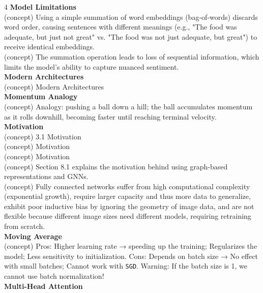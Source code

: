 \documentclass[8pt]{extarticle}
\begin{document}
\begin{multicols}{4}
\vspace{2pt}\textbf{Model Limitations}\\
(concept) Using a simple summation of word embeddings (bag‑of‑words) discards word order, causing sentences with different meanings (e.g., "The food was adequate, but just not great" vs. "The food was not just adequate, but great") to receive identical embeddings.\\
(concept) The summation operation leads to loss of sequential information, which limits the model's ability to capture nuanced sentiment.\\
\vspace{2pt}\textbf{Modern Architectures}\\
(concept) Modern Architectures\\
\vspace{2pt}\textbf{Momentum Analogy}\\
(concept) Analogy: pushing a ball down a hill; the ball accumulates momentum as it rolls downhill, becoming faster until reaching terminal velocity.\\
\vspace{2pt}\textbf{Motivation}\\
(concept) 3.1 Motivation\\
(concept) Motivation\\
(concept) Motivation\\
(concept) Section 8.1 explains the motivation behind using graph-based representations and GNNs.\\
(concept) Fully connected networks suffer from high computational complexity (exponential growth), require larger capacity and thus more data to generalize, exhibit poor inductive bias by ignoring the geometry of image data, and are not flexible because different image sizes need different models, requiring retraining from scratch.\\
\vspace{2pt}\textbf{Moving Average}\\
(concept) Pros: Higher learning rate → speeding up the training; Regularizes the model; Less sensitivity to initialization. Cons: Depends on batch size → No effect with small batches; Cannot work with \texttt{SGD}. Warning: If the batch size is 1, we cannot use batch normalization!\\
\vspace{2pt}\textbf{Multi-Head Attention}\\


\end{multicols}
\end{document}
